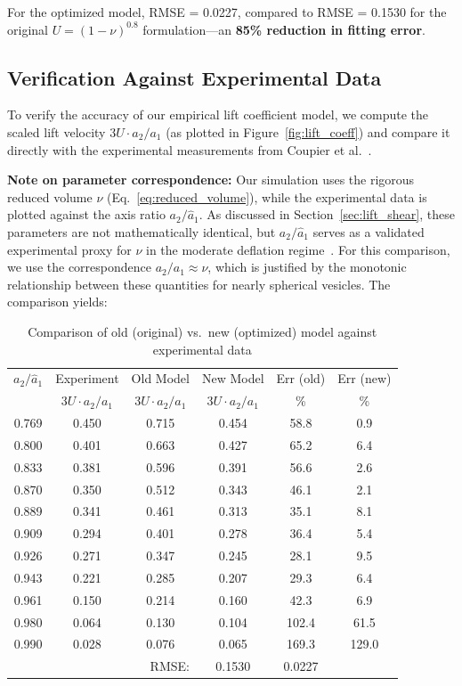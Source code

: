 \documentclass{article}
\begin{document}
For the optimized model, RMSE = 0.0227, compared to RMSE = 0.1530 for the original $U = (1-\nu)^{0.8}$ formulation---an \textbf{85\% reduction in fitting error}.

\subsection{Verification Against Experimental Data}

To verify the accuracy of our empirical lift coefficient model, we compute the scaled lift velocity $3U \cdot a_2/a_1$ (as plotted in Figure~\ref{fig:lift_coeff}) and compare it directly with the experimental measurements from Coupier et al.~\cite{coupier2009}.

\textbf{Note on parameter correspondence:} Our simulation uses the rigorous reduced volume $\nu$ (Eq.~\ref{eq:reduced_volume}), while the experimental data is plotted against the axis ratio $a_2/\hat{a}_1$. As discussed in Section~\ref{sec:lift_shear}, these parameters are not mathematically identical, but $a_2/\hat{a}_1$ serves as a validated experimental proxy for $\nu$ in the moderate deflation regime~\cite{olla1997}. For this comparison, we use the correspondence $a_2/a_1 \approx \nu$, which is justified by the monotonic relationship between these quantities for nearly spherical vesicles. The comparison yields:

\begin{table}[H]
\centering
\caption{Comparison of old (original) vs.~new (optimized) model against experimental data}
\label{tab:lift_comparison}
\begin{tabular}{cccccc}
\toprule
$a_2/\hat{a}_1$ & Experiment & Old Model & New Model & Err (old) & Err (new) \\
 & $3U \cdot a_2/a_1$ & $3U \cdot a_2/a_1$ & $3U \cdot a_2/a_1$ & \% & \% \\
\midrule
0.769 & 0.450 & 0.715 & 0.454 & 58.8 & 0.9 \\
0.800 & 0.401 & 0.663 & 0.427 & 65.2 & 6.4 \\
0.833 & 0.381 & 0.596 & 0.391 & 56.6 & 2.6 \\
0.870 & 0.350 & 0.512 & 0.343 & 46.1 & 2.1 \\
0.889 & 0.341 & 0.461 & 0.313 & 35.1 & 8.1 \\
0.909 & 0.294 & 0.401 & 0.278 & 36.4 & 5.4 \\
0.926 & 0.271 & 0.347 & 0.245 & 28.1 & 9.5 \\
0.943 & 0.221 & 0.285 & 0.207 & 29.3 & 6.4 \\
0.961 & 0.150 & 0.214 & 0.160 & 42.3 & 6.9 \\
0.980 & 0.064 & 0.130 & 0.104 & 102.4 & 61.5 \\
0.990 & 0.028 & 0.076 & 0.065 & 169.3 & 129.0 \\
\midrule
\multicolumn{3}{r}{RMSE:} & 0.1530 & 0.0227 & \\
\bottomrule
\end{tabular}
\end{table}
\end{document}
